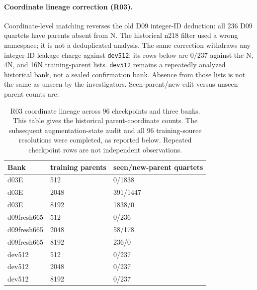\paragraph{Coordinate lineage correction (R03).} Coordinate-level matching reverses the old D09 integer-ID deduction: all 236 D09 quartets have parents absent from N. The historical n218 filter used a wrong namespace; it is not a deduplicated analysis. The same correction withdraws any integer-ID leakage charge against \texttt{dev512}: its rows below are $0/237$ against the N, 4N, and 16N training-parent lists. \texttt{dev512} remains a repeatedly analyzed historical bank, not a sealed confirmation bank. Absence from those lists is not the same as unseen by the investigators. Seen-parent/new-edit versus unseen-parent counts are:
\begin{table}[t]\centering\small\begin{tabular}{@{}lll@{}}\toprule
Bank & training parents & seen/new-parent quartets \\
\midrule
d03E & 512 & 0/1838 \\
d03E & 2048 & 391/1447 \\
d03E & 8192 & 1838/0 \\
d09fresh665 & 512 & 0/236 \\
d09fresh665 & 2048 & 58/178 \\
d09fresh665 & 8192 & 236/0 \\
dev512 & 512 & 0/237 \\
dev512 & 2048 & 0/237 \\
dev512 & 8192 & 0/237 \\
\bottomrule\end{tabular}\caption{R03 coordinate lineage across 96 checkpoints and three banks. This table gives the historical parent-coordinate counts. The subsequent augmentation-state audit and all 96 training-source resolutions were completed, as reported below. Repeated checkpoint rows are not independent observations.}\end{table}
